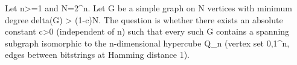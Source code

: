 Let n>=1 and N=2^n. Let G be a simple graph on N vertices with minimum degree delta(G) > (1-c)N. The question is whether there exists an absolute constant c>0 (independent of n) such that every such G contains a spanning subgraph isomorphic to the n-dimensional hypercube Q_n (vertex set {0,1}^n, edges between bitstrings at Hamming distance 1).
